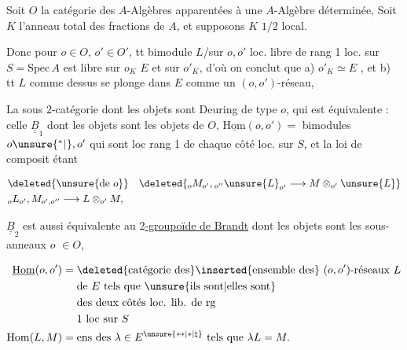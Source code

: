 Soit  $O$ la catégorie des $A$-Algèbres apparentées  à une $A$-Algèbre déterminée,  Soit $K$ l'anneau total des fractions de $A$,  et supposons $K$ $1/2$ local.

Donc  pour $o\in O$, $o'\in O'$, tt bimodule $L$/sur $o,o'$ loc. libre de rang 1  loc. sur $S=\mathrm{Spec}\,A$ est libre  sur $o_K$ \deleted{\unsure{$=$|$\simeq$}} $E$ et sur $o'_K$, d'où on conclut que
a) $o'_K\simeq E$  , et b)  tt $L$ comme dessus se plonge  dans $E$  comme un $(o,o')$-réseau,

La sous $2$-catégorie  dont les objets sont   Deuring de type $o$,  qui est équivalente : celle $\underline{\underline B}_1$ dont les objets sont les objets de $O$, $\underline{\mathrm{Hom}}(o,o')=$  bimodules  $o\unsure{^{*}|^{}},o'$ qui sont loc   rang 1 de chaque côté loc. sur $S$, et la loi de composit étant

\[
\begin{aligned}
&\deleted{\unsure{\mathrm{de}\ o}}\quad
\deleted{{}_oM_{o'},{}_{o''}\unsure{L}_{o'}\longrightarrow M\otimes_{o'}\unsure{L}}\\
&{}_oL_{o'},M_{o',o''}\longrightarrow L\otimes_{o'}M,
\end{aligned}
\]

$\underline{\underline B}_2$ est aussi équivalente au \uline{$2$-groupoïde de Brandt} dont les objets sont les sous-anneaux $o$   $\in O$, 

\[
\begin{aligned}
\underline{\mathrm{Hom}}(o,o')={}&\deleted{\text{catégorie des}}\inserted{\text{ensemble des}}\
 (o,o')\text{-réseaux }L\\
&\text{de }E\text{ tels que } \unsure{\text{ils sont}|\text{elles sont}}\\
&\text{des deux côtés loc. lib. de rg}\\
&1\text{ loc sur }S\\
\mathrm{Hom}(L,M)={}&\text{ens des }\lambda\in E^{\unsure{\leftrightarrow|*|\natural}}\text{ tels que }\lambda L=M.
\end{aligned}
\]

